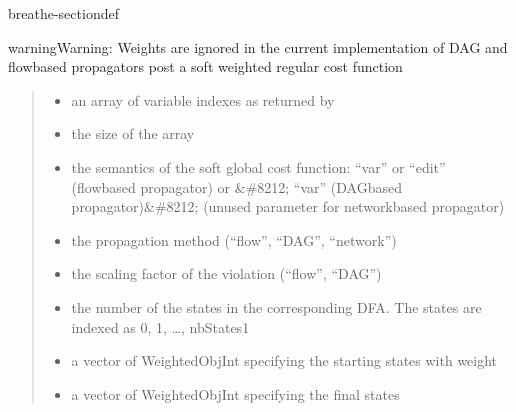 \documentclass[letterpaper,10pt,openany,oneside,english]{sphinxmanual}
\begin{document}
\begin{fulllineitems}
\begin{sphinxuseclass}{breathe-sectiondef}
\begin{fulllineitems}
\begin{sphinxadmonition}{warning}{Warning:}
\sphinxAtStartPar
Weights are ignored in the current implementation of DAG and flow\sphinxhyphen{}based propagators post a soft weighted regular cost function 
\end{sphinxadmonition}
\begin{quote}\begin{description}
\begin{itemize}
\item {} 
\sphinxAtStartPar
{} \textendash{} an array of variable indexes as returned by {\hyperref[\detokenize{ref/ref_cpp:classWeightedCSP_1a2329c94c60817153e45de627c79f8281}]{}} 

\item {} 
\sphinxAtStartPar
{} \textendash{} the size of the array 

\item {} 
\sphinxAtStartPar
{} \textendash{} the semantics of the soft global cost function: “var” or “edit” (flow\sphinxhyphen{}based propagator) or \&\#8212; “var” (DAG\sphinxhyphen{}based propagator)\&\#8212; (unused parameter for network\sphinxhyphen{}based propagator) 

\item {} 
\sphinxAtStartPar
{} \textendash{} the propagation method (“flow”, “DAG”, “network”) 

\item {} 
\sphinxAtStartPar
{} \textendash{} the scaling factor of the violation (“flow”, “DAG”) 

\item {} 
\sphinxAtStartPar
{} \textendash{} the number of the states in the corresponding DFA. The states are indexed as 0, 1, …, nbStates\sphinxhyphen{}1 

\item {} 
\sphinxAtStartPar
{} \textendash{} a vector of WeightedObjInt specifying the starting states with weight 

\item {} 
\sphinxAtStartPar
{} \textendash{} a vector of WeightedObjInt specifying the final states 


\end{itemize}
\end{description}
\end{quote}
\end{fulllineitems}
\end{sphinxuseclass}
\end{fulllineitems}
\end{document}
